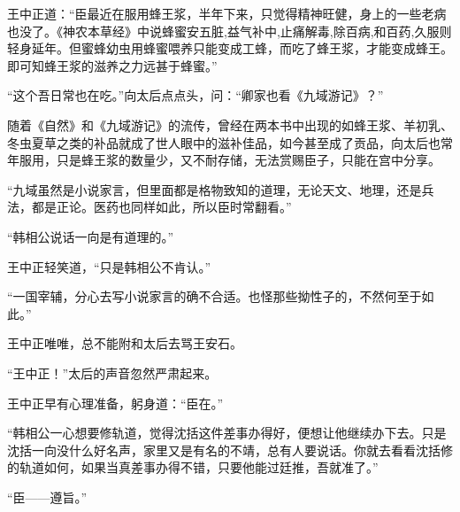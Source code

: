 王中正道：“臣最近在服用蜂王浆，半年下来，只觉得精神旺健，身上的一些老病也没了。《神农本草经》中说蜂蜜安五脏,益气补中,止痛解毒,除百病,和百药,久服则轻身延年。但蜜蜂幼虫用蜂蜜喂养只能变成工蜂，而吃了蜂王浆，才能变成蜂王。即可知蜂王浆的滋养之力远甚于蜂蜜。”

“这个吾日常也在吃。”向太后点点头，问：“卿家也看《九域游记》？”

随着《自然》和《九域游记》的流传，曾经在两本书中出现的如蜂王浆、羊初乳、冬虫夏草之类的补品就成了世人眼中的滋补佳品，如今甚至成了贡品，向太后也常年服用，只是蜂王浆的数量少，又不耐存储，无法赏赐臣子，只能在宫中分享。

“九域虽然是小说家言，但里面都是格物致知的道理，无论天文、地理，还是兵法，都是正论。医药也同样如此，所以臣时常翻看。”

“韩相公说话一向是有道理的。”

王中正轻笑道，“只是韩相公不肯认。”

“一国宰辅，分心去写小说家言的确不合适。也怪那些拗性子的，不然何至于如此。”

王中正唯唯，总不能附和太后去骂王安石。

“王中正！”太后的声音忽然严肃起来。

王中正早有心理准备，躬身道：“臣在。”

“韩相公一心想要修轨道，觉得沈括这件差事办得好，便想让他继续办下去。只是沈括一向没什么好名声，家里又是有名的不靖，总有人要说话。你就去看看沈括修的轨道如何，如果当真差事办得不错，只要他能过廷推，吾就准了。”

“臣——遵旨。”
